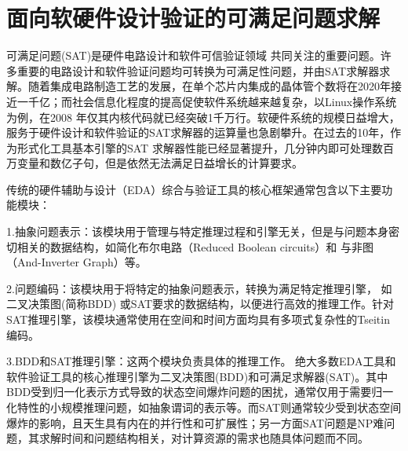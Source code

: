 
\section{面向软硬件设计验证的可满足问题求解}
可满足问题(SAT)是硬件电路设计和软件可信验证领域 共同关注的重要问题。许多重要的电路设计和软件验证问题均可转换为可满足性问题，并由SAT求解器求解。随着集成电路制造工艺的发展，在单个芯片内集成的晶体管个数将在2020年接近一千亿；而社会信息化程度的提高促使软件系统越来越复杂，以Linux操作系统为例，在2008 年仅其内核代码就已经突破1千万行。软硬件系统的规模日益增大，服务于硬件设计和软件验证的SAT求解器的运算量也急剧攀升。在过去的10年，作为形式化工具基本引擎的SAT 求解器性能已经显著提升，几分钟内即可处理数百万变量和数亿子句，但是依然无法满足日益增长的计算要求。

传统的硬件辅助与设计（EDA）综合与验证工具的核心框架通常包含以下主要功能模块：

1.抽象问题表示：该模块用于管理与特定推理过程和引擎无关，但是与问题本身密切相关的数据结构，如简化布尔电路（Reduced Boolean circuits）和
与非图（And-Inverter Graph）等。

2.问题编码：该模块用于将特定的抽象问题表示，转换为满足特定推理引擎，
如二叉决策图(简称BDD) 或SAT要求的数据结构，以便进行高效的推理工作。针对SAT推理引擎，该模块通常使用在空间和时间方面均具有多项式复杂性的Tseitin 编码。

3.BDD和SAT推理引擎：这两个模块负责具体的推理工作。
绝大多数EDA工具和软件验证工具的核心推理引擎为二叉决策图(BDD)和可满足求解器(SAT)。其中BDD受到归一化表示方式导致的状态空间爆炸问题的困扰，通常仅用于需要归一化特性的小规模推理问题，如抽象谓词的表示等。而SAT则通常较少受到状态空间爆炸的影响，且天生具有内在的并行性和可扩展性；另一方面SAT问题是NP难问题，其求解时间和问题结构相关，对计算资源的需求也随具体问题而不同。

